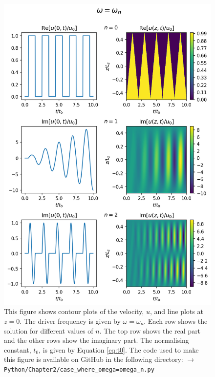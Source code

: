\begin{figure}
    \centering
    \vspace{-20pt}
    \includegraphics[width=\textwidth,height=0.85\textheight,keepaspectratio]{figures/chapter02/case_where_omega=omega_n_u.png}
    \vspace{-10pt}
    \caption{This figure shows contour plots of the velocity, $u$, and line plots at $z=0$. The driver frequency is given by $\omega=\omega_n$. Each row shows the solution for different values of $n$. The top row shows the real part and the other rows show the imaginary part. The normalising constant, $t_0$, is given by Equation \eqref{eq:t0}. The code used to make this figure is available on GitHub in the following directory:\newline
    \texttt{$\rightarrow$ Python/Chapter2/case\_where\_omega=omega\_n.py}
    }
    \label{fig:case_where_omega=omega_n_u}
    \vspace{-30pt}
\end{figure}

